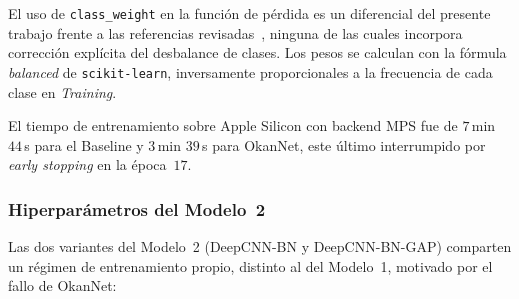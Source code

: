 El uso de \texttt{class\_weight} en la función de pérdida es un
diferencial del presente trabajo frente a las referencias
revisadas~\cite{okannet2026,gupta2023}, ninguna de las cuales
incorpora corrección explícita del desbalance de clases. Los
pesos se calculan con la fórmula \textit{balanced} de
\texttt{scikit-learn}, inversamente proporcionales a la
frecuencia de cada clase en \textit{Training}.

El tiempo de entrenamiento sobre Apple Silicon con backend MPS
fue de $7$\,min $44$\,s para el Baseline y $3$\,min $39$\,s
para OkanNet, este último interrumpido por \textit{early
stopping} en la época~$17$.

\subsubsection*{Hiperparámetros del Modelo~2}
\label{sec:hiperparam-m2}

Las dos variantes del Modelo~2 (DeepCNN-BN y DeepCNN-BN-GAP)
comparten un régimen de entrenamiento propio, distinto al del
Modelo~1, motivado por el fallo de OkanNet:

